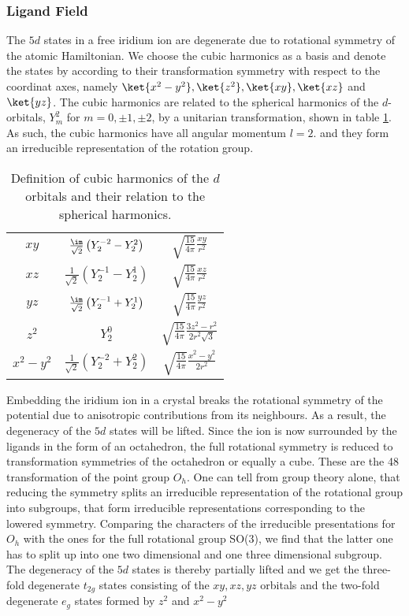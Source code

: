 \subsubsection{Ligand Field}

The $5d$ states  in a free iridium ion are degenerate due to rotational symmetry of the atomic Hamiltonian. 
We choose the cubic harmonics as a basis and  denote the states by according to their transformation symmetry with respect to the coordinat axes, namely 
$\ket{x^2-y^2},\ket{z^2},\ket{xy},\ket{xz}$ and $\ket{yz}$.
The cubic harmonics are related to the spherical harmonics  of the $d$-orbitals, $Y^2_m$ for $m=0,\pm1,\pm2$, by a unitarian transformation, shown in table \ref{sphericHarmonics}.
As such, the cubic harmonics have all angular momentum $l=2$. 
and they form an irreducible representation of the rotation group.
\begin{table}
\begin{center}
\begin{tabular}{|c|c|c|}
 \hline
 $xy$ & $\frac{\im}{\sqrt 2} \left( Y^{-2}_2 - Y^2_2 \right)$ & $\sqrt{\frac{15}{4\pi}} \frac{xy}{r^2}$ \\
 $xz$ & $\frac{  1}{\sqrt 2} \left( Y^{-1}_2 - Y^1_2 \right)$ & $\sqrt{\frac{15}{4\pi}} \frac{xz}{r^2}$ \\
 $yz$ & $\frac{\im}{\sqrt 2} \left( Y^{-1}_2 + Y^1_2 \right)$ & $\sqrt{\frac{15}{4\pi}} \frac{yz}{r^2}$ \\
 $z^2$& $ Y^0_{2} 					      $	& $\sqrt{\frac{15}{4\pi}} \frac{3z^2-r^2}{2r^2\sqrt 3} $\\
 $x^2-y^2$&$\frac1{\sqrt 2} \left( Y^{-2}_2 + Y^2_2 \right) $ & $\sqrt{\frac{15}{4\pi}} \frac{x^2-y^2}{2r^2} $ \\
 \hline
\end{tabular}
\caption{Definition of cubic harmonics of the $d$ orbitals and their relation to the spherical harmonics.}
\label{sphericHarmonics}
\end{center}
\end{table}
%

Embedding the iridium ion in a crystal breaks the rotational symmetry of the potential due to anisotropic contributions from its neighbours.
As a result, the degeneracy of the $5d$ states will be lifted. 
Since the ion is now surrounded by the ligands in the form of an octahedron, the 
full rotational symmetry is reduced to transformation symmetries of the octahedron or equally a cube. 
These are the 48 transformation of the point group $O_h$.
One can tell from group theory alone, that reducing the symmetry splits an irreducible representation of the rotational group into subgroups, that form irreducible representations 
corresponding to the lowered symmetry. 
Comparing the characters of the irreducible presentations for $O_h$ with the ones for the full rotational group SO(3), we find that 
the latter one has to split up into one  two dimensional and one three dimensional subgroup. 
The degeneracy of the $5d$ states is thereby partially lifted and we get the 
three-fold degenerate $t_{2g}$ states consisting of the $xy,xz,yz$ orbitals and the two-fold degenerate $e_g$ states formed by $z^2$ and $x^2-y^2$ \cite[Chapter~4]{Tinkham64} 

